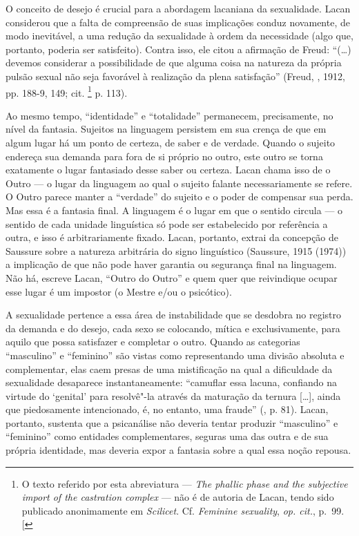O conceito de desejo é crucial para a abordagem lacaniana da
sexualidade. Lacan considerou que a falta de compreensão de suas
implicações conduz novamente, de modo inevitável, a uma redução da
sexualidade à ordem da necessidade (algo que, portanto, poderia ser
satisfeito). Contra isso, ele citou a afirmação de Freud: ``(\ldots{})
devemos considerar a possibilidade de que alguma coisa na natureza da
própria pulsão sexual não seja favorável à realização da plena
satisfação'' (Freud, , 1912, pp. 188-9, 149; cit. \footnote{O texto
  referido por esta abreviatura --- \emph{The phallic phase and the
  subjective import of the castration complex} --- não é de autoria de
  Lacan, tendo sido publicado anonimamente em \emph{Scilicet}. Cf.
  \emph{Feminine sexuality}, \emph{op. cit.}, p.~99. {[}\versal{N.~T.}{]}} p.
113).

Ao mesmo tempo, ``identidade'' e ``totalidade'' permanecem,
precisamente, no nível da fantasia. Sujeitos na linguagem persistem em
sua crença de que em algum lugar há um ponto de certeza, de saber e de
verdade. Quando o sujeito endereça sua demanda para fora de si próprio
no outro, este outro se torna exatamente o lugar fantasiado desse saber
ou certeza. Lacan chama isso de o Outro --- o lugar da linguagem ao qual
o sujeito falante necessariamente se refere. O Outro parece manter a
``verdade'' do sujeito e o poder de compensar sua perda. Mas essa é a
fantasia final. A linguagem é o lugar em que o sentido circula --- o
sentido de cada unidade linguística só pode ser estabelecido por
referência a outra, e isso é arbitrariamente fixado. Lacan, portanto,
extrai da concepção de Saussure sobre a natureza arbitrária do signo
linguístico (Saussure, 1915 (1974)) a implicação de que não pode haver
garantia ou segurança final na linguagem. Não há, escreve Lacan, ``Outro
do Outro'' e quem quer que reivindique ocupar esse lugar é um impostor
(o Mestre e/ou o psicótico).

A sexualidade pertence a essa área de instabilidade que se desdobra no
registro da demanda e do desejo, cada sexo se colocando, mítica e
exclusivamente, para aquilo que possa satisfazer e completar o outro.
Quando as categorias ``masculino'' e ``feminino'' são vistas como
representando uma divisão absoluta e complementar, elas caem presas de
uma mistificação na qual a dificuldade da sexualidade desaparece
instantaneamente: ``camuflar essa lacuna, confiando na virtude do
`genital' para resolvê"-la através da maturação da ternura {[}\ldots{}{]},
ainda que piedosamente intencionado, é, no entanto, uma fraude'' (, p.
81). Lacan, portanto, sustenta que a psicanálise não deveria tentar
produzir ``masculino'' e ``feminino'' como entidades complementares,
seguras uma das outra e de sua própria identidade, mas deveria expor a
fantasia sobre a qual essa noção repousa.

